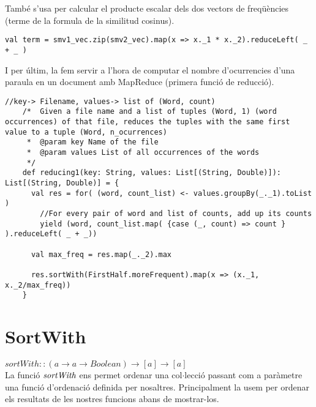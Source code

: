 \documentclass{report}
\begin{document}
També s'usa per calcular el producte escalar dels dos vectors de freqüències (terme de la formula de la similitud cosinus).

\begin{lstlisting}[style=scalaHighlight]
    val term = smv1_vec.zip(smv2_vec).map(x => x._1 * x._2).reduceLeft( _ + _ )
\end{lstlisting}

\newpage

I per últim, la fem servir a l'hora de computar el nombre d'ocurrencies d'una paraula en un document amb MapReduce (primera funció de reducció).

\begin{lstlisting}[style=scalaHighlight]
//key-> Filename, values-> list of (Word, count)
    /* 	Given a file name and a list of tuples (Word, 1) (word occurrences) of that file, reduces the tuples with the same first value to a tuple (Word, n_ocurrences)
     * 	@param key Name of the file
     * 	@param values List of all occurrences of the words
     */
    def reducing1(key: String, values: List[(String, Double)]): List[(String, Double)] = {
      val res = for( (word, count_list) <- values.groupBy(_._1).toList )
        //For every pair of word and list of counts, add up its counts
        yield (word, count_list.map( {case (_, count) => count } ).reduceLeft( _ + _))

      val max_freq = res.map(_._2).max

      res.sortWith(FirstHalf.moreFrequent).map(x => (x._1, x._2/max_freq))
    }
\end{lstlisting}

\newpage

\section{SortWith}

$ sortWith :: (a \rightarrow a \rightarrow Boolean) \rightarrow [a] \rightarrow [a] $ \\

La funció $ \emph{sortWith} $ ens permet ordenar una col$\cdot$lecció passant com a paràmetre una funció d'ordenació definida per nosaltres. Principalment la usem per ordenar els resultats de les nostres funcions abans de mostrar-los.
\end{document}

